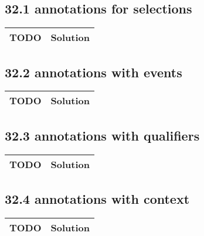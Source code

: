  \subsection*{32.1 annotations for selections}
 \begin{tabular}{|p{}|p{}|}
 \hline
 \textbf{TODO} &
 \textbf{Solution} 
\\
 \hline
 \end{tabular} \subsection*{32.2 annotations with events}
 \begin{tabular}{|p{}|p{}|}
 \hline
 \textbf{TODO} &
 \textbf{Solution} 
\\
 \hline
 \end{tabular} \subsection*{32.3 annotations with qualifiers}
 \begin{tabular}{|p{}|p{}|}
 \hline
 \textbf{TODO} &
 \textbf{Solution} 
\\
 \hline
 \end{tabular} \subsection*{32.4 annotations with context}
 \begin{tabular}{|p{}|p{}|}
 \hline
 \textbf{TODO} &
 \textbf{Solution} 
\\
 \hline
 \end{tabular} 